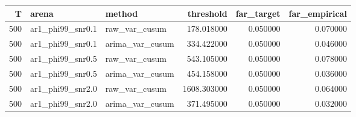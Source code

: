 \begin{tabular}{rllrrr}
\toprule
T & arena & method & threshold & far_target & far_empirical \\
\midrule
500 & ar1_phi99_snr0.1 & raw_var_cusum & 178.018000 & 0.050000 & 0.070000 \\
500 & ar1_phi99_snr0.1 & arima_var_cusum & 334.422000 & 0.050000 & 0.046000 \\
500 & ar1_phi99_snr0.5 & raw_var_cusum & 543.105000 & 0.050000 & 0.078000 \\
500 & ar1_phi99_snr0.5 & arima_var_cusum & 454.158000 & 0.050000 & 0.036000 \\
500 & ar1_phi99_snr2.0 & raw_var_cusum & 1608.303000 & 0.050000 & 0.064000 \\
500 & ar1_phi99_snr2.0 & arima_var_cusum & 371.495000 & 0.050000 & 0.032000 \\
\bottomrule
\end{tabular}
